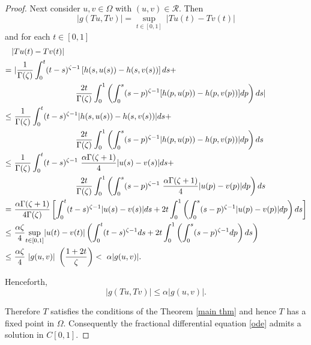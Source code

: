 \documentclass[10pt, reqno]{amsart}
\theoremstyle{definition}
\theoremstyle{remark}
\numberwithin{equation}{section}
\begin{document}
\begin{proof}
Next consider $ u, v \in \Omega $ with $ ( u, v ) \in \mathcal{R} $. Then 
$$ | g ( T u, T v ) | =  \underset{t \in [0, 1 ] }{\sup} ~ | T u ( t ) -  T v ( t ) |   $$
and  for each $ t \in [ 0, 1  ] $
\begin{align*}
	&  | T u ( t ) -  T v ( t ) |  \\
	= & ~  | \dfrac{1}{\Gamma ( \zeta )}\int_{0}^{t} ( t- s)^{ \zeta - 1} \left[  h (s, u (s) ) -  h (s, v (s) )  \right] ds + \\
		& \hskip 80 pt  \dfrac{2 t }{\Gamma ( \zeta )} \int_{0}^{1} \left(  \int_{0}^{s} ( s - p)^{ \zeta - 1} [ h  ( p, u ( p ) ) -  h  ( p, v ( p ) ) ] dp \right) ds   |   \\
		\leq & ~ \dfrac{1}{\Gamma ( \zeta )} \int_{0}^{t} ( t- s)^{ \zeta - 1}  |  h (s, u (s) ) -  h (s, v (s) )  | ds + \\
		&  \hskip 80 pt  \dfrac{2 t }{\Gamma ( \zeta )} \int_{0}^{1} \left(  \int_{0}^{s} ( s - p)^{ \zeta - 1} | h  ( p, u ( p ) ) -  h  ( p, v ( p ) )  | dp   \right) ds \\
		\leq & ~  \dfrac{1}{\Gamma ( \zeta )} \int_{0}^{t} ( t- s)^{ \zeta - 1}   ~ \dfrac{\alpha \Gamma ( \zeta + 1 ) }{4} | u ( s ) - v ( s ) | ds + \\
		&  \hskip 80 pt  \dfrac{2 t }{\Gamma ( \zeta )} \int_{0}^{1} \left(  \int_{0}^{s} ( s - p)^{ \zeta - 1} ~ \dfrac{\alpha  \Gamma ( \zeta + 1 ) }{4}  |   u ( p )   -    v ( p )    | dp   \right) ds \\
		= & ~ \dfrac{ \alpha  \Gamma ( \zeta + 1 ) }{ 4 \Gamma ( \zeta )} \left[  \int_{0}^{t} ( t- s)^{ \zeta - 1}  | u ( s ) - v ( s ) | ds  + 2 t \int_{0}^{1} \left(  \int_{0}^{s} ( s - p )^{ \zeta - 1}    |   u ( p )   -    v ( p )    | dp   \right) ds \right]  \\
		\leq & ~ \dfrac{ \alpha    \zeta   }{ 4  }  \underset{t \in [ 0, 1]}{\sup}  |   u ( t )   -    v ( t ) | \left( \int_{0}^{t} ( t- s)^{ \zeta - 1} ds + 2t  \int_{0}^{1} \left(  \int_{0}^{s} ( s - p )^{ \zeta - 1}  dp   \right) ds \right)  \\
		\leq & ~ \dfrac{ \alpha  \zeta  }{ 4  } ~ | g ( u, v )|  ~ \left( \dfrac{1 + 2 t}{\zeta}   \right)  
		<   ~ \alpha | g ( u, v )|. 
\end{align*}

Henceforth,
$$   | g ( T u, T v ) | \leq \alpha | g ( u, v ) |.  $$ 
%

Therefore $T$ satisfies the conditions of the  Theorem \ref{main thm} and hence $T$ has a fixed point in $ \Omega $.  Consequently   the fractional differential equation \ref{ode} admits a solution in $ C [ 0, 1 ] $. 
\end{proof}
\end{document}
